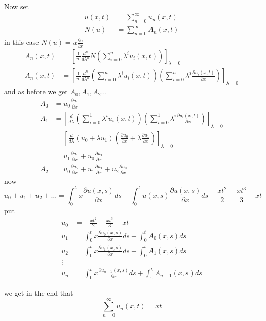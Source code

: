 \documentclass[]{article}
\begin{document}
Now set
\begin{align*}
    u(x,t) &= \sum_{n=0}^{\infty} u_n(x,t)
\\
N(u) &= \sum_{n=0}^{\infty} A_n(x,t)
\end{align*}
in this case $N(u) = u \frac{\partial u}{\partial x}$
\begin{align*}
A_n(x,t) &= \left[\frac{1}{n!} \frac{d^n}{d \lambda^n} N\left(\sum_{i=0}^{n}  \lambda^i u_i(x,t)\right)\right]_{\lambda = 0}
\\
A_n(x,t) &= \left[\frac{1}{n!} \frac{d^n}{d \lambda^n} \left(\sum_{i=0}^{n}  \lambda^i u_i(x,t)\right)\left(\sum_{i=0}^{n}  \lambda^i \frac{\partial u_i(x,t)}{\partial x}\right)\right]_{\lambda = 0}
\end{align*}
and as before we get $A_0,A_1,A_2\dots$
\begin{align*}
    A_0 &= u_0\frac{\partial u_0}{\partial x}
    \\
    A_1 &= \left[\frac{d}{d \lambda} \left(\sum_{i=0}^{1}  \lambda^i u_i(x,t)\right)\left(\sum_{i=0}^{1}  \lambda^i \frac{\partial u_i(x,t)}{\partial x}\right)\right]_{\lambda = 0}
    \\
    &= \left[\frac{d}{d \lambda} \left(u_0 + \lambda u_1 \right)\left(\frac{\partial u_0}{\partial x} + \lambda\frac{\partial u_1}{\partial x}\right)\right]_{\lambda = 0}
    \\
    &= u_1 \frac{\partial u_0}{\partial x} + u_0 \frac{\partial u_1}{\partial x}
    \\
    A_2 &= u_0 \frac{\partial u_2}{\partial x} + u_1 \frac{\partial u_1}{\partial x} + u_2 \frac{\partial u_0}{\partial x}
\end{align*}
now 
\[
u_0 + u_1 + u_2+\dots = \int_{0}^{t}x\frac{\partial u(x,s)}{\partial x}ds + \int_{0}^{t}u(x,s)\frac{\partial u(x,s)}{\partial x}ds - \frac{xt^2}{2} - \frac{xt^3}{3} + xt
\]
put 
\begin{align*}
    u_0 &=  - \frac{xt^2}{2} - \frac{xt^3}{3} + xt
    \\
    u_1 &= \int_{0}^{t}x\frac{\partial u_0(x,s)}{\partial x}ds + \int_{0}^{t}A_0(x,s)ds
    \\
    u_2 &= \int_{0}^{t}x\frac{\partial u_1(x,s)}{\partial x}ds + \int_{0}^{t}A_1(x,s)ds
    \\
    \vdots
    \\
    u_n &= \int_{0}^{t}x\frac{\partial u_{n-1}(x,s)}{\partial x}ds + \int_{0}^{t}A_{n-1}(x,s)ds
\end{align*}

we get in the end that 
\[
    \sum_{n=0}^{\infty} u_n(x,t) = xt    
\]
\end{document}
